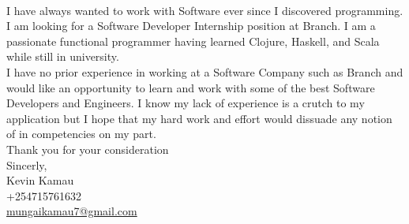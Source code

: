 \documentclass[12pt,a4paper]{article}
\begin{document}
\\







\noindent I have always wanted to work with Software ever since I discovered programming.\\


\noindent I am looking for a Software Developer Internship position at Branch. I am a passionate functional programmer having learned Clojure, Haskell, and Scala while still in university.\\

\noindent I have no prior experience in working at a Software Company such as Branch and would like an opportunity to learn and work with some of the best Software Developers and Engineers. I know my lack of experience is a crutch to my application but I hope that my hard work and effort would dissuade any notion of in competencies on my part.\\[0.5cm]

\noindent Thank you for your consideration\\


\noindent Sincerly,\\

\noindent Kevin Kamau\\
\noindent +254715761632\\
\noindent \href{mailto:mungaikamau7@gmail.com}{mungaikamau7@gmail.com}\\
\end{document}
